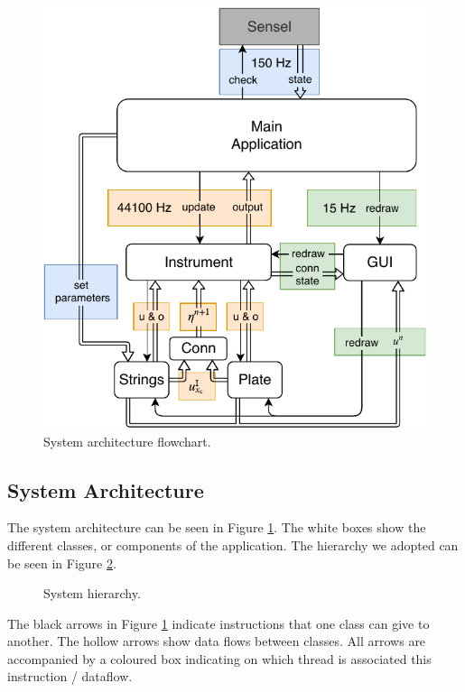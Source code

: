 \documentclass{article}
\begin{document}
\begin{figure}[h]
\centering
\includegraphics[width=1.0\columnwidth]{JUCE.pdf}
\caption{System architecture flowchart. \label{fig:flowchart}}
\end{figure}

\subsection{System Architecture}
The system architecture can be seen in Figure \ref{fig:flowchart}. The white boxes show the different classes, or components of the application. The hierarchy we adopted can be seen in Figure \ref{fig:hierarchy}.

\begin{figure}[h]
\centering
    \caption{System hierarchy. \label{fig:hierarchy}}
\end{figure}
The black arrows in Figure \ref{fig:flowchart} indicate instructions that one class can give to another. The hollow arrows show data flows between classes. All arrows are accompanied by a coloured box indicating on which thread is associated this instruction / dataflow.
\end{document}
